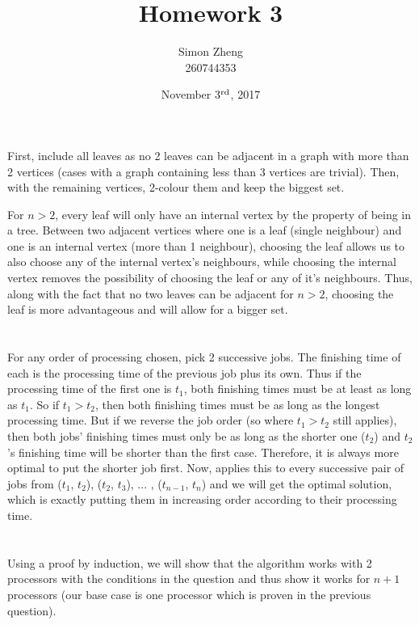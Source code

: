 \documentclass[11pt,letterpaper]{article}
\author{Simon Zheng\\260744353}
\title{Homework 3}
\date{November 3$^{\textnormal{rd}}$, 2017}
\begin{document}
	\maketitle
	\thispagestyle{fancy}
	
	\section{}
		First, include all leaves as no 2 leaves can be adjacent in a graph with more than 2 vertices (cases with a graph containing less than 3 vertices are trivial). Then, with the remaining vertices, 2-colour them and keep the biggest set.
		
		For $n>2$, every leaf will only have an internal vertex by the property of being in a tree. Between two adjacent vertices where one is a leaf (single neighbour) and one is an internal vertex (more than 1 neighbour), choosing the leaf allows us to also choose any of the internal vertex's neighbours, while choosing the internal vertex removes the possibility of choosing the leaf or any of it's neighbours.
		Thus, along with the fact that no two leaves can be adjacent for $n>2$, choosing the leaf is more advantageous and will allow for a bigger set.
		
	\section{}
		For any order of processing chosen, pick 2 successive jobs.
		The finishing time of each is the processing time of the previous job plus its own. Thus if the processing time of the first one is $t_1$, both finishing times must be at least as long as $t_1$.
		So if $t_1 > t_2$, then both finishing times must be as long as the longest processing time.
		But if we reverse the job order (so where $t_1 > t_2$ still applies), then both jobs' finishing times must only be as long as the shorter one ($t_2$) and $t_2$'s finishing time will be shorter than the first case.
		Therefore, it is always more optimal to put the shorter job first.
		Now, applies this to every successive pair of jobs from ($t_1$, $t_2$), ($t_2$, $t_3$), ... , ($t_{n-1}$, $t_n$) and we will get the optimal solution, which is exactly putting them in increasing order according to their processing time.
		
	\section{}
		Using a proof by induction, we will show that the algorithm works with 2 processors with the conditions in the question and thus show it works for $n+1$ processors (our base case is one processor which is proven in the previous question).
		
\end{document}

